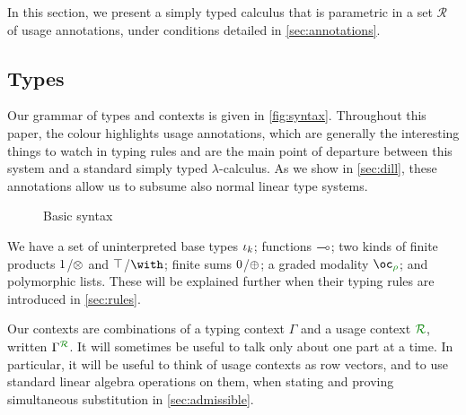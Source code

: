 In this section, we present a simply typed calculus \name{} that is parametric
in a set $\mathscr{R}$ of usage annotations, under conditions detailed in
\autoref{sec:annotations}.

\subsection{Types}

Our grammar of types and contexts is given in \autoref{fig:syntax}.
Throughout this paper, the colour  highlights usage
annotations, which are generally the interesting things to watch in typing rules
and are the main point of departure between this system and a standard simply
typed $\lambda$-calculus.
As we show in \autoref{sec:dill}, these annotations allow us to subsume also
normal linear type systems. 


\begin{figure}
  \caption{Basic syntax}
  \label{fig:syntax}
\end{figure}

We have a set of uninterpreted base types $\iota_k$; functions $\multimap$; two
kinds of finite products $1$/$\otimes$ and
$\top$/$\withT{}{}$; finite sums $0$/$\oplus$; a graded modality
$\excl{\rho}{}$; and polymorphic lists.
These will be explained further when their typing rules are introduced in
\autoref{sec:rules}.

Our contexts are combinations of a typing context $\Gamma$ and a usage
context $\resctx R$, written $\ctx{\Gamma}{R}$.
It will sometimes be useful to talk only about one part at a time.
In particular, it will be useful to think of usage contexts as row
vectors, and to use standard linear algebra operations on them, when stating and
proving simultaneous substitution in \autoref{sec:admissible}.


